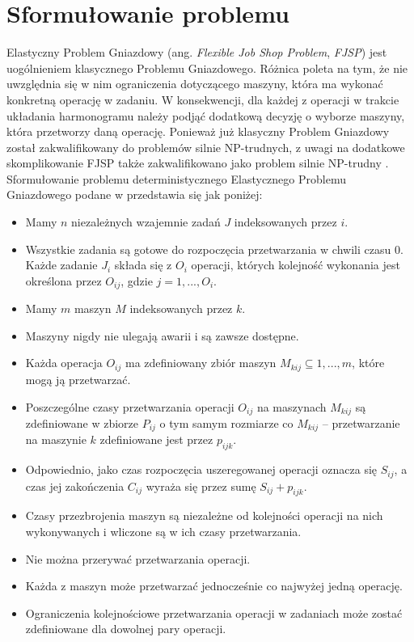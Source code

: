\documentclass[printmode,oneside]{mgr}
\begin{document}
\chapter{Sformułowanie problemu}
Elastyczny Problem Gniazdowy (ang. \emph{Flexible Job Shop Problem}, \emph{FJSP}) jest uogólnieniem klasycznego Problemu Gniazdowego. Różnica poleta na tym, że nie uwzględnia się w nim ograniczenia dotyczącego maszyny, która ma wykonać konkretną operację w zadaniu. W konsekwencji, dla każdej z operacji w trakcie układania harmonogramu należy podjąć dodatkową decyzję o wyborze maszyny, która przetworzy daną operację. Ponieważ już klasyczny Problem Gniazdowy został zakwalifikowany do problemów silnie NP-trudnych, z uwagi na dodatkowe skomplikowanie FJSP także zakwalifikowano jako problem silnie NP-trudny \cite{Tay2004}. Sformułowanie problemu deterministycznego Elastycznego Problemu Gniazdowego podane w \cite{AEHGAFJS_ElMekkawy11} przedstawia się jak poniżej:
\begin{itemize}
    \item Mamy $n$ niezależnych wzajemnie zadań $J$ indeksowanych przez $i$.
    \item Wszystkie zadania są gotowe do rozpoczęcia przetwarzania w chwili czasu 0.
    Każde zadanie $J_i$ składa się z $O_i$ operacji, których kolejność wykonania jest określona przez $O_{ij}$, gdzie $j = 1, ..., O_i$.
    \item Mamy $m$ maszyn $M$ indeksowanych przez $k$.
    \item Maszyny nigdy nie ulegają awarii i są zawsze dostępne.
    \item Każda operacja $O_{ij}$ ma zdefiniowany zbiór maszyn $M_{kij} \subseteq {1, ..., m}$, które mogą ją przetwarzać.
    \item Poszczególne czasy przetwarzania operacji $O_{ij}$ na maszynach $M_{kij}$ są zdefiniowane w zbiorze $P_{ij}$ o tym samym rozmiarze co $M_{kij}$ -- przetwarzanie na maszynie $k$ zdefiniowane jest przez $p_{ijk}$.
    \item Odpowiednio, jako czas rozpoczęcia uszeregowanej operacji oznacza się $S_{ij}$, a czas jej zakończenia $C_{ij}$ wyraża się przez sumę $S_{ij} + p_{ijk}$.
    \item Czasy przezbrojenia maszyn są niezależne od kolejności operacji na nich wykonywanych i wliczone są w ich czasy przetwarzania.
    \item Nie można przerywać przetwarzania operacji.
    \item Każda z maszyn może przetwarzać jednocześnie co najwyżej jedną operację.
    \item Ograniczenia kolejnościowe przetwarzania operacji w zadaniach może zostać zdefiniowane dla dowolnej pary operacji.
\end{itemize}
\end{document}
